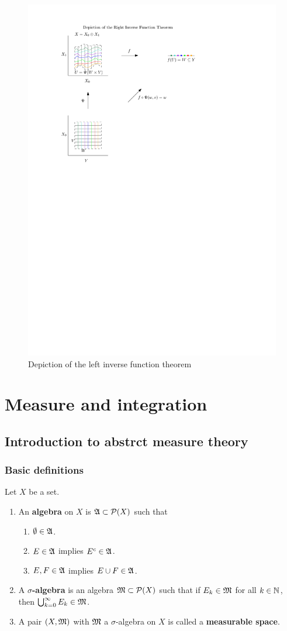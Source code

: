 \documentclass[a4paper]{article}
\begin{document}
\begin{figure}[h!]
  \centering
  \includegraphics[width=0.55\linewidth]{fig/right_inverse.pdf}
  \caption{Depiction of the left inverse function theorem}
\end{figure}


\section{Measure and integration}

\subsection{Introduction to abstrct measure theory}

\subsubsection{Basic definitions}

\begin{defi}
  Let $X$ be a set. 
  \begin{enumerate}
    \item An \textbf{algebra} on $X$ is $\mathfrak{A} \subset 
    \mathcal{P}(X)$ such that 
    \begin{enumerate}
      \item $\emptyset \in \mathfrak{A}$.
      \item $E \in \mathfrak{A}$ implies $E^c \in \mathfrak{A}$.
      \item $E, F \in \mathfrak{A}$ implies $E \cup F \in \mathfrak{A}$.
    \end{enumerate}
    
    \item A \textbf{$\sigma$-algebra} is an algebra 
    $\mathfrak{M} \subset \mathcal{P}(X)$ such that if 
    $E_k \in \mathfrak{M}$ for all $k \in \mathbb{N}$, then 
    $\bigcup_{k=0}^\infty E_k \in \mathfrak{M}$. 

    \item A pair $(X, \mathfrak{M})$ with $\mathfrak{M}$ a $\sigma$-algebra 
    on $X$ is called a \textbf{measurable space}.
  \end{enumerate}
\end{defi}
\end{document}
